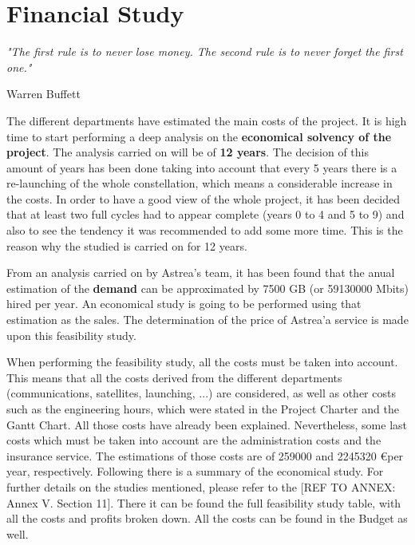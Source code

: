 \chapter{Financial Study}
\epigraph{\textit{"The first rule is to never lose money. The second rule is to never forget the first one."}}{Warren Buffett} 

The different departments have estimated the main costs of the project. It is high time to start performing a deep analysis on the \textbf{economical solvency of the project}. The analysis carried on will be of \textbf{12 years}. The decision of this amount of years has been done taking into account that every 5 years there is a re-launching of the whole constellation, which means a considerable increase in the costs. In order to have a good view of the whole project, it has been decided that at least two full cycles had to appear complete (years 0 to 4 and 5 to 9) and also to see the tendency it was recommended to add some more time. This is the reason why the studied is carried on for 12 years.

From an analysis carried on by Astrea's team, it has been found that the anual estimation of the \textbf{demand} can be approximated by 7500 GB (or 59130000 Mbits) hired per year. An economical study is going to be performed using that estimation as the sales. The determination of the price of Astrea'a service is made upon this feasibility study. 

When performing the feasibility study, all the costs must be taken into account. This means that all the costs derived from the different departments (communications, satellites, launching, ...) are considered, as well as other costs such as the engineering hours, which were stated in the Project Charter and the Gantt Chart. All those costs have already been explained. Nevertheless, some last costs which must be taken into account are the administration costs and the insurance service. The estimations of those costs are of 259000 and 2245320 \euro  per year, respectively. Following there is a summary of the economical study. For further details on the studies mentioned, please refer to the [{REF TO ANNEX: Annex V. Section 11}]. There it can be found the full feasibility study table, with all the costs and profits broken down. All the costs can be found in the Budget as well.




